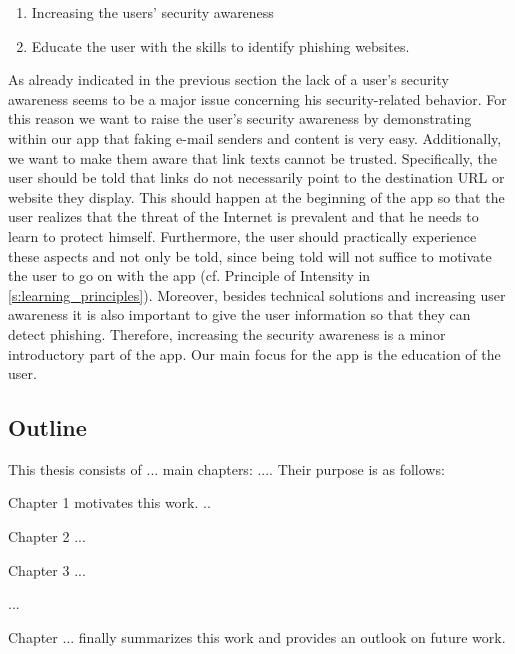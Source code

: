 \begin{enumerate}
	\item Increasing the users' security awareness
	\item Educate the user with the skills to identify phishing websites.

\end{enumerate}

As already indicated in the previous section the lack of a user's security awareness seems to be a major issue concerning his security-related behavior.
 For this reason we want to raise the user's security awareness by demonstrating within our app that faking e-mail senders and content is very easy.
 Additionally, we want to make them aware that link texts cannot be trusted.
Specifically, the user should be told that links do not necessarily point to the destination URL or website they display.
 This should happen at the beginning of the app so that the user realizes that the threat of the Internet is prevalent and that he needs to learn to protect himself.
 Furthermore, the user should practically experience these aspects and not only be told, since being told will not suffice to motivate the user to go on with the app (cf. Principle of Intensity in \autoref{s:learning_principles}).
 Moreover, besides technical solutions and increasing user awareness it is also important to give the user information so that they can detect phishing.
 Therefore, increasing the security awareness is a minor introductory part of the app.
 Our main focus for the app is the education of the user.

\subsection{Outline}


This thesis consists of ... main chapters: .... Their purpose is as follows:

Chapter 1 motivates this work.
..

Chapter 2 ...

Chapter 3 ...

...

Chapter ... finally summarizes this work and provides an outlook on future work.






